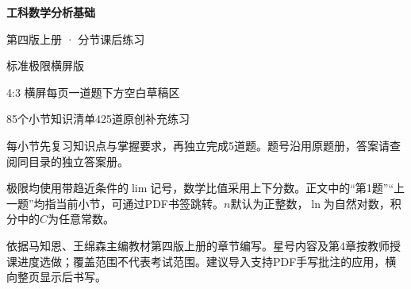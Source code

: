 \documentclass[12pt,fontset=fandol]{ctexrep}
\begin{document}
\fontsize{14}{21}\selectfont
\thispagestyle{empty}
\begin{center}
\vspace*{9mm}
{\fontsize{27}{36}\selectfont\bfseries 工科数学分析基础\par}
\vspace{4mm}
{\fontsize{22}{30}\selectfont 第四版上册 · 分节课后练习\par}
\vspace{5mm}
{\Large 标准极限横屏版\par}
\vspace{5mm}
4:3 横屏\quad 每页一道题\quad 下方空白草稿区\par
85个小节知识清单\quad 425道原创补充练习\par
\end{center}
\vspace{5mm}
{\fontsize{11}{17}\selectfont
每小节先复习知识点与掌握要求，再独立完成5道题。题号沿用原题册，答案请查阅同目录的独立答案册。

极限均使用带趋近条件的$\lim$记号，数学比值采用上下分数。正文中的“第1题”“上一题”均指当前小节，可通过PDF书签跳转。$n$默认为正整数，$\ln$为自然对数，积分中的$C$为任意常数。

依据马知恩、王绵森主编教材第四版上册的章节编写。星号内容及第4章按教师授课进度选做；覆盖范围不代表考试范围。建议导入支持PDF手写批注的应用，横向整页显示后书写。\par}
\expandafter\printpractice\originalpractice\stoppractice
\end{document}
